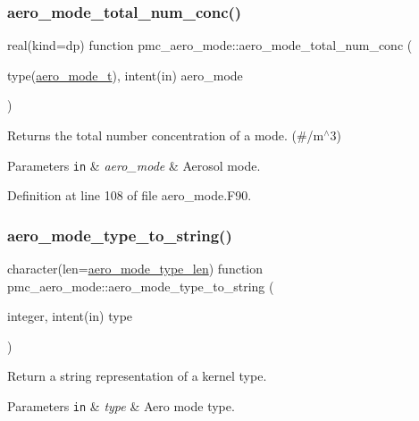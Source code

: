 \subsubsection{\texorpdfstring{aero\+\_\+mode\+\_\+total\+\_\+num\+\_\+conc()}{aero\_mode\_total\_num\_conc()}}
{\footnotesize\ttfamily real(kind=dp) function pmc\+\_\+aero\+\_\+mode\+::aero\+\_\+mode\+\_\+total\+\_\+num\+\_\+conc (\begin{DoxyParamCaption}\item[{type(\mbox{\hyperlink{structpmc__aero__mode_1_1aero__mode__t}{aero\+\_\+mode\+\_\+t}}), intent(in)}]{aero\+\_\+mode }\end{DoxyParamCaption})}



Returns the total number concentration of a mode. (\#/m$^\wedge$3) 


\begin{DoxyParams}[1]{Parameters}
\mbox{\tt in}  & {\em aero\+\_\+mode} & Aerosol mode. \\
\hline
\end{DoxyParams}


Definition at line 108 of file aero\+\_\+mode.\+F90.

\mbox{\label{namespacepmc__aero__mode_abbf5d1701e0dacb20f4b15ed2c21263d}} 
\subsubsection{\texorpdfstring{aero\+\_\+mode\+\_\+type\+\_\+to\+\_\+string()}{aero\_mode\_type\_to\_string()}}
{\footnotesize\ttfamily character(len=\mbox{\hyperlink{namespacepmc__aero__mode_a267ddc1551b2f71a22191d1c14577227}{aero\+\_\+mode\+\_\+type\+\_\+len}}) function pmc\+\_\+aero\+\_\+mode\+::aero\+\_\+mode\+\_\+type\+\_\+to\+\_\+string (\begin{DoxyParamCaption}\item[{integer, intent(in)}]{type }\end{DoxyParamCaption})}



Return a string representation of a kernel type. 


\begin{DoxyParams}[1]{Parameters}
\mbox{\tt in}  & {\em type} & Aero mode type. \\
\hline
\end{DoxyParams}


